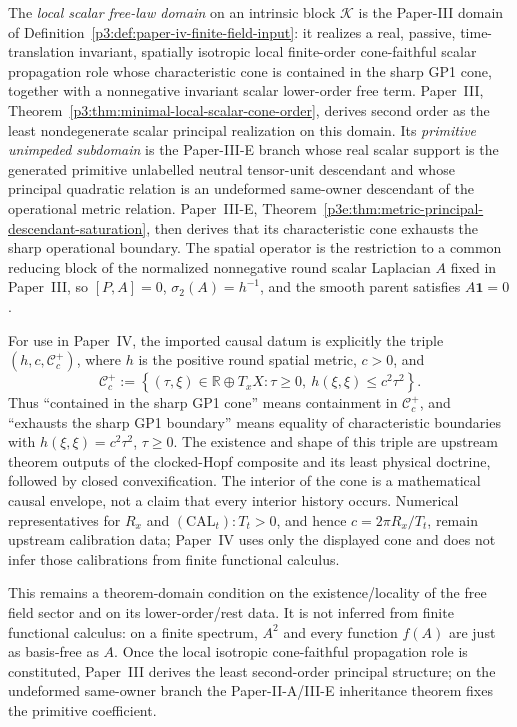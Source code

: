 \documentclass[12pt,a4paper]{article}
\begin{document}
\begin{definition}
\label{p4:def:minimal-uninserted-free-scalar-cover-domain}
The \emph{local scalar free-law domain} on an intrinsic block
\(\mathcal K\) is the Paper-III domain of
Definition~\ref{p3:def:paper-iv-finite-field-input}: it realizes a real,
passive, time-translation invariant, spatially isotropic local finite-order
cone-faithful scalar propagation role whose characteristic cone is contained in
the sharp GP1 cone, together with a nonnegative invariant scalar lower-order
free term.  Paper~III,
Theorem~\ref{p3:thm:minimal-local-scalar-cone-order}, derives second order as
the least nondegenerate scalar principal realization on this domain.  Its
\emph{primitive unimpeded subdomain} is the Paper-III-E branch whose real
scalar support is the generated primitive unlabelled neutral tensor-unit
descendant and whose principal quadratic relation is an undeformed same-owner
descendant of the operational metric relation.  Paper~III-E,
Theorem~\ref{p3e:thm:metric-principal-descendant-saturation}, then derives
that its characteristic cone exhausts the sharp operational boundary.  The spatial
operator is the restriction to a common reducing block of the normalized
nonnegative round scalar Laplacian \(A\) fixed in Paper~III, so
\([P,A]=0\), \(\sigma_2(A)=h^{-1}\), and the smooth parent satisfies
\(A\mathbf1=0\).

For use in Paper~IV, the imported causal datum is explicitly the triple
\((h,c,\mathcal C_c^+)\), where \(h\) is the positive round spatial metric,
\(c>0\), and
\begin{equation}
\label{p4:eq:explicit-imported-gp1-cone}
 \mathcal C_c^+
 :=
 \left\{(\tau,\xi)\in\mathbb R\oplus T_xX:
 \tau\ge0,
 \ h(\xi,\xi)\le c^2\tau^2\right\}.
\end{equation}
Thus ``contained in the sharp GP1 cone'' means containment in
\(\mathcal C_c^+\), and ``exhausts the sharp GP1 boundary'' means equality
of characteristic boundaries with
\(h(\xi,\xi)=c^2\tau^2\), \(\tau\ge0\).  The existence and shape of this
triple are upstream theorem outputs of the clocked-Hopf composite and its
least physical doctrine, followed by closed convexification.  The interior of
the cone is a mathematical causal envelope, not a claim that every interior
history occurs.  Numerical representatives for \(R_x\) and
\((\mathrm{CAL}_t):T_t>0\), and hence \(c=2\pi R_x/T_t\), remain upstream
calibration data; Paper~IV uses
only the displayed cone and does not infer those calibrations from finite
functional calculus.

This remains a theorem-domain condition on the existence/locality of the free
field sector and on its lower-order/rest data.  It is not inferred from finite
functional calculus: on a finite spectrum, \(A^2\) and every function
\(f(A)\) are just as basis-free as \(A\).  Once the local isotropic
cone-faithful propagation role is constituted, Paper~III derives the least
second-order principal structure; on the undeformed same-owner branch the
Paper-II-A/III-E inheritance theorem fixes the primitive coefficient.
\end{definition}
\end{document}
